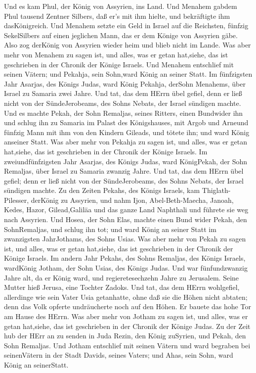  Und es kam Phul, der König von Assyrien, ins Land. Und
Menahem gabdem Phul tausend Zentner Silbers, daß er's mit ihm hielte,
und bekräftigte ihm dasKönigreich.  Und Menahem setzte ein
Geld in Israel auf die Reichsten, fünfzig SekelSilbers auf einen
jeglichen Mann, das er dem Könige von Assyrien gäbe. Also zog derKönig
von Assyrien wieder heim und blieb nicht im Lande.  Was
aber mehr von Menahem zu sagen ist, und alles, was er getan hat,siehe,
das ist geschrieben in der Chronik der Könige Israels.  Und
Menahem entschlief mit seinen Vätern; und Pekahja, sein Sohn,ward König
an seiner Statt.  Im fünfzigsten Jahr Asarjas, des Königs
Judas, ward König Pekahja, derSohn Menahems, über Israel zu Samaria zwei
Jahre.  Und tat, das dem HErrn übel gefiel, denn er ließ
nicht von der SündeJerobeams, des Sohns Nebats, der Israel sündigen
machte.  Und es machte Pekah, der Sohn Remaljas, seines
Ritters, einen Bundwider ihn und schlug ihn zu Samaria im Palast des
Königshauses, mit Argob und Arneund fünfzig Mann mit ihm von den Kindern
Gileads, und tötete ihn; und ward König anseiner Statt. 
Was aber mehr von Pekahja zu sagen ist, und alles, was er getan
hat,siehe, das ist geschrieben in der Chronik der Könige Israels.
 Im zweiundfünfzigsten Jahr Asarjas, des Königs Judas, ward
KönigPekah, der Sohn Remaljas, über Israel zu Samaria zwanzig Jahre.
 Und tat, das dem HErrn übel gefiel; denn er ließ nicht von
der SündeJerobeams, des Sohns Nebats, der Israel sündigen machte.
 Zu den Zeiten Pekahs, des Königs Israels, kam
Thiglath-Pilesser, derKönig zu Assyrien, und nahm Ijon,
Abel-Beth-Maecha, Janoah, Kedes, Hazor, Gilead,Galiläa und das ganze
Land Naphthali und führete sie weg nach Assyrien.  Und
Hosea, der Sohn Elas, machte einen Bund wider Pekah, den SohnRemaljas,
und schlug ihn tot; und ward König an seiner Statt im zwanzigsten
JahrJothams, des Sohns Usias.  Was aber mehr von Pekah zu
sagen ist, und alles, was er getan hat,siehe, das ist geschrieben in der
Chronik der Könige Israels.  Im andern Jahr Pekahs, des
Sohns Remaljas, des Königs Israels, wardKönig Jotham, der Sohn Usias,
des Königs Judas.  Und war fünfundzwanzig Jahre alt, da er
König ward, und regieretesechzehn Jahre zu Jerusalem. Seine Mutter hieß
Jerusa, eine Tochter Zadoks.  Und tat, das dem HErrn
wohlgefiel, allerdinge wie sein Vater Usia getanhatte, 
ohne daß sie die Höhen nicht abtaten; denn das Volk opferte undräucherte
noch auf den Höhen. Er bauete das hohe Tor am Hause des HErrn.
 Was aber mehr von Jotham zu sagen ist, und alles, was er
getan hat,siehe, das ist geschrieben in der Chronik der Könige Judas.
 Zu der Zeit hub der HErr an zu senden in Juda Rezin, den
König zuSyrien, und Pekah, den Sohn Remaljas.  Und Jotham
entschlief mit seinen Vätern und ward begraben bei seinenVätern in der
Stadt Davids, seines Vaters; und Ahas, sein Sohn, ward König an
seinerStatt.

